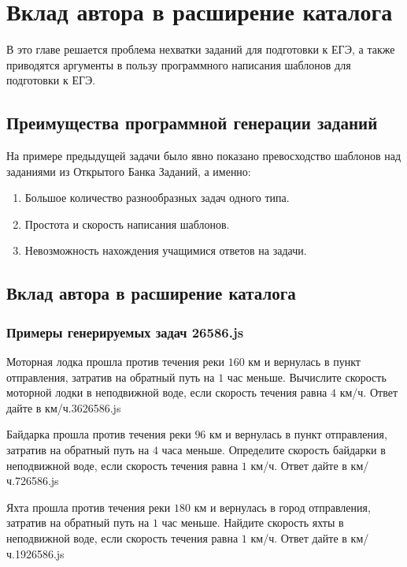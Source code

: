 \section{Вклад автора в расширение каталога}\label{2sect}
В это главе решается проблема нехватки заданий для подготовки к ЕГЭ, а также приводятся аргументы в пользу программного написания шаблонов для подготовки к ЕГЭ.

\subsection{Преимущества программной генерации заданий}
На примере предыдущей задачи было явно показано превосходство шаблонов над заданиями из Открытого Банка Заданий, а именно:
\begin{enumerate}
	\item Большое количество разнообразных задач одного типа. 
	\item Простота и скорость написания шаблонов. 
    \item Невозможность нахождения учащимися ответов на задачи.
\end{enumerate}

\subsection{Вклад автора в расширение каталога}


\subsubsection*{Примеры генерируемых задач 26586.js}

\par{Моторная лодка прошла против течения реки $160$ км и вернулась в пункт отправления, затратив на обратный путь на $1$ час меньше. Вычислите скорость моторной лодки в неподвижной воде, если скорость течения равна $4$ км/ч. Ответ дайте в км/ч.}{36}{26586.js}
\par{Байдарка прошла против течения реки $96$ км и вернулась в пункт отправления, затратив на обратный путь на $4$ часа меньше. Определите скорость байдарки в неподвижной воде, если скорость течения равна $1$ км/ч. Ответ дайте в км/ч.}{7}{26586.js}
\par{Яхта прошла против течения реки $180$ км и вернулась в город отправления, затратив на обратный путь на $1$ час меньше. Найдите скорость яхты в неподвижной воде, если скорость течения равна $1$ км/ч. Ответ дайте в км/ч.}{19}{26586.js}

